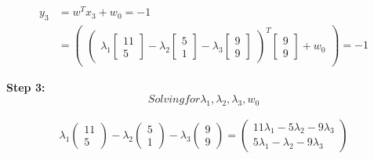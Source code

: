 \documentclass[12pt]{report}
\begin{document}
\begin{equation*}
	\begin{aligned}
		y_{3} & =  w^T x_{3} + w_{0} = -1            \\
		      & = \begin{pmatrix}
			          \begin{pmatrix}
				\lambda_{1}\begin{bmatrix}
					           11 \\
					           5
				           \end{bmatrix} -

				\lambda_{2}\begin{bmatrix}
					           5 \\
					           1
				           \end{bmatrix} -

				\lambda_{3}\begin{bmatrix}
					           9 \\
					           9
				           \end{bmatrix}
			\end{pmatrix}  ^ T
			          \begin{bmatrix}
				9 \\
				9
			\end{bmatrix} + w_{0}
		          \end{pmatrix} = -1
	\end{aligned}
\end{equation*}

\vspace{20pt}

\textbf{Step 3:}
\begin{equation*}
	Solving for \lambda_{1}, \lambda_{2}, \lambda_{3}, w_{0}
\end{equation*}


\begin{equation*}
	\begin{aligned}
		\lambda_{1}\begin{pmatrix}11 \\ 5\end{pmatrix}-\lambda_{2}\begin{pmatrix}5\\ 1\end{pmatrix}-\lambda_{3}\begin{pmatrix}9\\ 9\end{pmatrix}=\begin{pmatrix}11\lambda_{1}-5\lambda_{2}-9\lambda_{3}\\ 5\lambda_{1}-\lambda_{2}-9\lambda_{3}\end{pmatrix}
	\end{aligned}
\end{equation*}
\end{document}

